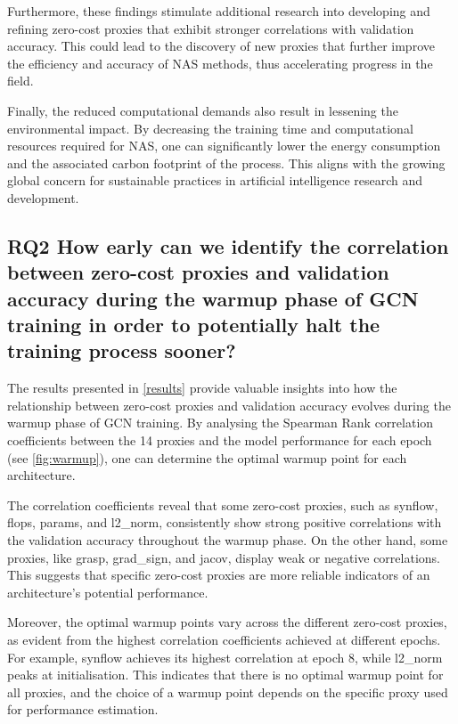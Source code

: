 Furthermore, these findings stimulate additional research into developing and refining zero-cost proxies that exhibit stronger correlations with validation accuracy. This could lead to the discovery of new proxies that further improve the efficiency and accuracy of \gls{NAS} methods, thus accelerating progress in the field.

Finally, the reduced computational demands also result in lessening the environmental impact. By decreasing the training time and computational resources required for \gls{NAS}, one can significantly lower the energy consumption and the associated carbon footprint of the process. This aligns with the growing global concern for sustainable practices in artificial intelligence research and development.


\subsection{RQ2 How early can we identify the correlation between zero-cost proxies and validation accuracy during the warmup phase of GCN training in order to potentially halt the training process sooner?}

The results presented in \cref{results} provide valuable insights into how the relationship between zero-cost proxies and validation accuracy evolves during the warmup phase of \gls{GCN} training. By analysing the Spearman Rank correlation coefficients between the 14 proxies and the model performance for each epoch (see \cref{fig:warmup}), one can determine the optimal warmup point for each architecture.

The correlation coefficients reveal that some zero-cost proxies, such as \gls{synflow}, flops, params, and l2\_norm, consistently show strong positive correlations with the validation accuracy throughout the warmup phase. On the other hand, some proxies, like \gls{grasp}, grad\_sign, and jacov, display weak or negative correlations. This suggests that specific zero-cost proxies are more reliable indicators of an architecture's potential performance.

Moreover, the optimal warmup points vary across the different zero-cost proxies, as evident from the highest correlation coefficients achieved at different epochs. For example, \gls{synflow} achieves its highest correlation at epoch 8, while l2\_norm peaks at initialisation. This indicates that there is no optimal warmup point for all proxies, and the choice of a warmup point depends on the specific proxy used for performance estimation.

